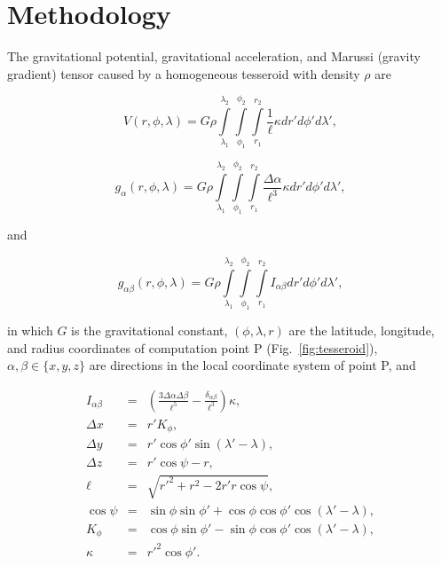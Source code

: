 \section{Methodology}

The gravitational potential,
gravitational acceleration,
and Marussi (gravity gradient) tensor
caused by a homogeneous tesseroid
with density $\rho$
are \citep{Grombein2013}

\begin{equation}
    V(r,\phi,\lambda) = G \rho
        \int\limits_{\lambda_1}^{\lambda_2}
        \int\limits_{\phi_1}^{\phi_2}
        \int\limits_{r_1}^{r_2}
        \frac{1}{\ell} \kappa  dr' d\phi' d\lambda',
    \label{eq:tesspot}
\end{equation}

\begin{equation}
    g_{\alpha}(r,\phi,\lambda) = G \rho
        \int\limits_{\lambda_1}^{\lambda_2}
        \int\limits_{\phi_1}^{\phi_2}
        \int\limits_{r_1}^{r_2}
        \frac{\Delta\alpha}{\ell^3} \kappa dr' d\phi' d\lambda',
    \label{eq:tessgrav}
\end{equation}

\noindent
and

\begin{equation}
    g_{\alpha\beta}(r,\phi,\lambda) = G \rho
        \int\limits_{\lambda_1}^{\lambda_2}
        \int\limits_{\phi_1}^{\phi_2}
        \int\limits_{r_1}^{r_2}
        I_{\alpha\beta}
        dr' d\phi' d\lambda',
    \label{eq:tesstensor}
\end{equation}

\noindent
in which
$G$ is the gravitational constant,
$(\phi, \lambda, r)$ are
the latitude, longitude, and radius
coordinates of computation point P (Fig.~\ref{fig:tesseroid}),
$\alpha,\beta \in \{x,y,z\}$
are directions in the local coordinate system of point P,
and

\begin{eqnarray}
    I_{\alpha\beta} &=&
        \left(
            \frac{3\Delta\alpha \Delta\beta}{\ell^5} -
            \frac{\delta_{\alpha\beta}}{\ell^3}
        \right) \kappa, \\
    \Delta x &=& r' K_{\phi} , \\
    \Delta y &=& r' \cos \phi' \sin(\lambda' - \lambda) , \\
    \Delta z &=& r' \cos \psi - r, \\
    \ell &=& \sqrt{r'^2 + r^2 - 2 r' r \cos \psi} , \\
    \cos\psi &=& \sin\phi\sin\phi' + \cos\phi\cos\phi'
                 \cos(\lambda' - \lambda) , \\
    K_{\phi} &=& \cos\phi\sin\phi' - \sin\phi\cos\phi'
                 \cos(\lambda' - \lambda), \\
    \kappa &=& {r'}^2 \cos \phi'.
\end{eqnarray}

